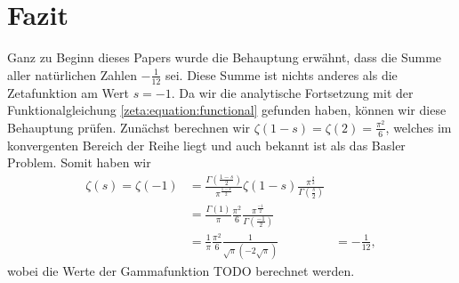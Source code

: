 \section{Fazit} \label{zeta:section:fazit}

Ganz zu Beginn dieses Papers wurde die Behauptung erwähnt, dass die Summe aller natürlichen Zahlen $-\frac{1}{12}$ sei.
Diese Summe ist nichts anderes als die Zetafunktion am Wert $s=-1$.
Da wir die analytische Fortsetzung mit der Funktionalgleichung \eqref{zeta:equation:functional} gefunden haben, können wir diese Behauptung prüfen.
Zunächst berechnen wir $\zeta(1-s) = \zeta(2) = \frac{\pi^2}{6}$, welches im konvergenten Bereich der Reihe liegt und auch bekannt ist als das Basler Problem.
Somit haben wir
\begin{align*}
    \zeta(s) = \zeta(-1)
    &=
    \frac{\Gamma \left( \frac{1-s}{2} \right)}{\pi^{\frac{1-s}{2}}}
    \zeta(1-s)
    \frac{\pi^{\frac{s}{2}}}{\Gamma \left( \frac{s}{2} \right)}
    \\
    &=
    \frac{\Gamma(1)}{\pi}
    \frac{\pi^2}{6}
    \frac{\pi^{\frac{-1}{2}}}{\Gamma \left( \frac{-1}{2} \right)}
    \\
    &=
    \frac{1}{\pi}
    \frac{\pi^2}{6}
    \frac{1}{\sqrt{\pi} (-2\sqrt{\pi})}
    &=
    -\frac{1}{12},
\end{align*}
wobei die Werte der Gammafunktion TODO berechnet werden.
